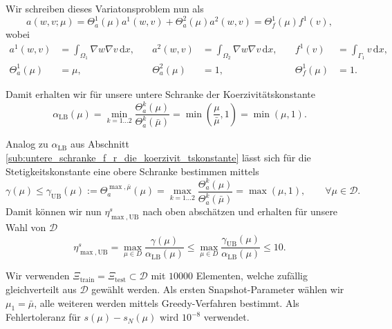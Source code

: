 Wir schreiben dieses Variatonsproblem nun als
\begin{equation}
    a(w, v;\mu) = \Theta_a^1(\mu) a^1(w, v) + \Theta_a^2(\mu) a^2(w, v) = \Theta_f^1(\mu) f^1(v),
\end{equation}
wobei
\begin{align}
    a^1(w, v) &= \int_{\Omega_1} \nabla w \nabla v \, \mathrm{d}x,
    \quad
    &a^2(w, v) &= \int_{\Omega_2} \nabla w \nabla v \, \mathrm{d}x,
    \quad
    &f^1(v) &= \int_{\Gamma_1} v \, \mathrm{d}x,
    \\
    \Theta_a^1(\mu) &= \mu,
    &\Theta_a^2(\mu) &= 1,
    &\Theta_f^1(\mu) &= 1.
\end{align}

Damit erhalten wir für unsere untere Schranke der Koerzivitätskonstante
\begin{equation}
    \alpha_\text{LB}(\mu) = \min_{k = 1 \ldots 2} \frac{\Theta_a^k(\mu)}{\Theta_a^k(\bar \mu)} = \min \left(  \frac{\mu}{\bar \mu}, 1  \right)  = \min(\mu, 1).
\end{equation}

Analog zu $\alpha_\text{LB}$ aus Abschnitt \ref{sub:untere_schranke_f_r_die_koerzivit_tskonstante} lässt sich für die Stetigkeitskonstante eine obere Schranke bestimmen mittels
\begin{equation}
    \gamma(\mu) \leq \gamma_\text{UB}(\mu) := \Theta_a^{\max, \bar \mu}(\mu) = \max_{k = 1 \ldots 2} \frac{\Theta_a^k(\mu)}{\Theta_a^k(\bar \mu)} = \max(\mu, 1), \qquad \forall \mu \in \mathcal D.
\end{equation}
Damit können wir nun $\eta^s_{\max,\text{UB}}$ nach oben abschätzen und erhalten für unsere Wahl von $\mathcal D$
\begin{equation}
    \eta^s_{\max,\text{UB}} = \max_{\mu \in D} \frac{\gamma(\mu)}{\alpha_{\text{LB}}(\mu)} \leq \max_{\mu \in D} \frac{\gamma_\text{UB}(\mu)}{\alpha_{\text{LB}}(\mu)} \leq 10.
\end{equation}

Wir verwenden $\Xi_\text{train} = \Xi_\text{test} \subset \mathcal D$ mit $10000$ Elementen, welche zufällig gleichverteilt aus $\mathcal D$ gewählt werden.
Als ersten Snapshot-Parameter wählen wir $\mu_1 = \bar \mu$, alle weiteren werden mittels Greedy-Verfahren bestimmt. Als Fehlertoleranz für $s(\mu) - s_N(\mu)$ wird $10^{-8}$ verwendet.

